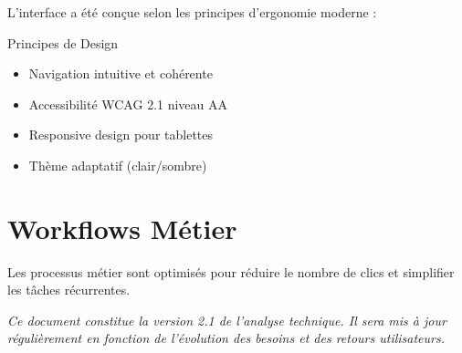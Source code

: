 \documentclass{modern-report}
\begin{document}
L'interface a été conçue selon les principes d'ergonomie moderne :

\begin{modernbox}{Principes de Design}
\begin{itemize}
    \item Navigation intuitive et cohérente
    \item Accessibilité WCAG 2.1 niveau AA
    \item Responsive design pour tablettes
    \item Thème adaptatif (clair/sombre)
\end{itemize}
\end{modernbox}

\section{Workflows Métier}

Les processus métier sont optimisés pour réduire le nombre de clics et simplifier les tâches récurrentes.

\modernseparator

\textit{Ce document constitue la version 2.1 de l'analyse technique. Il sera mis à jour régulièrement en fonction de l'évolution des besoins et des retours utilisateurs.}
\end{document}
